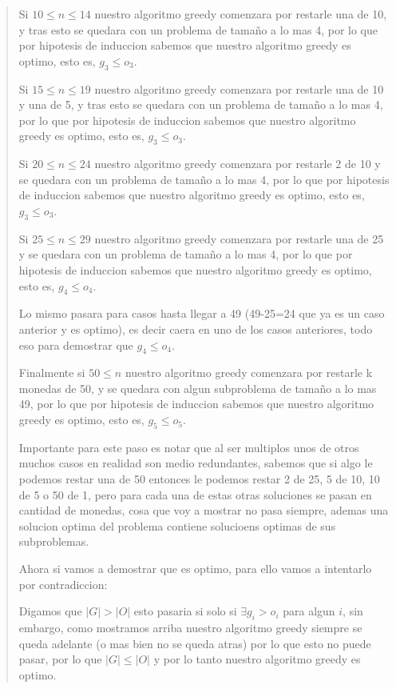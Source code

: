 \begin{quote}
    Si $10 \leq n \leq 14$ nuestro algoritmo greedy comenzara por restarle una de 10, y tras esto se quedara con un problema de tamaño a lo mas 4, por lo que por hipotesis de induccion sabemos que nuestro algoritmo greedy es optimo, esto es, $g_3 \leq o_3$. \vspace{.2cm}

    Si $15 \leq n \leq 19$ nuestro algoritmo greedy comenzara por restarle una de 10 y una de 5, y tras esto se quedara con un problema de tamaño a lo mas 4, por lo que por hipotesis de induccion sabemos que nuestro algoritmo greedy es optimo, esto es, $g_3 \leq o_3$. \vspace{.2cm}

    Si $20 \leq n \leq 24$ nuestro algoritmo greedy comenzara por restarle 2 de 10 y se quedara con un problema de tamaño a lo mas 4, por lo que por hipotesis de induccion sabemos que nuestro algoritmo greedy es optimo, esto es, $g_3 \leq o_3$. \vspace{.2cm} 

    Si $25 \leq n \leq 29$ nuestro algoritmo greedy comenzara por restarle una de 25 y se quedara con un problema de tamaño a lo mas 4, por lo que por hipotesis de induccion sabemos que nuestro algoritmo greedy es optimo, esto es, $g_4 \leq o_4$. \vspace{.2cm}

    Lo mismo pasara para casos hasta llegar a 49 (49-25=24 que ya es un caso anterior y es optimo), es decir caera en uno de los casos anteriores, todo eso para demostrar que $g_4 \leq o_4$. \vspace{.2cm}

    Finalmente si $50 \leq n$ nuestro algoritmo greedy comenzara por restarle k monedas de 50, y se quedara con algun subproblema de tamaño a lo mas 49, por lo que por hipotesis de induccion sabemos que nuestro algoritmo greedy es optimo, esto es, $g_5 \leq o_5$. \vspace{.2cm}

    Importante para este paso es notar que al ser multiplos unos de otros muchos casos en realidad son medio redundantes, sabemos que si algo le podemos restar una de 50 entonces le podemos restar 2 de 25, 5 de 10, 10 de 5 o 50 de 1, pero para cada una de estas otras soluciones se pasan en cantidad de monedas, cosa que voy a mostrar no pasa siempre, ademas una solucion optima del problema contiene solucioens optimas de sus subproblemas. \vspace{.2cm} 

    Ahora si vamos a demostrar que es optimo, para ello vamos a intentarlo por contradiccion: \vspace{.2cm}

    Digamos que $|G| > |O|$ esto pasaria si solo si $ \exists g_i > o_i$ para algun $i$, sin embargo, como mostramos arriba nuestro algoritmo greedy siempre se queda adelante (o mas bien no se queda atras) por lo que esto no puede pasar, por lo que $|G| \leq |O|$ y por lo tanto nuestro algoritmo greedy es optimo. \vspace{.2cm}
\end{quote}